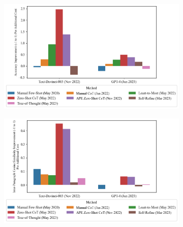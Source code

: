 \documentclass[11pt]{article}
\begin{document}
\begin{figure}
  \caption{Gains Per Cent v. Direct Prompting}
  \begin{subfigure}[h]{0.4925\textwidth}
      \centering
      \includegraphics[width=0.95\hsize]{../Output for Report/gsm8k_change_in_accuracy_quality_per_change_in_cost_sorted_by_technique_age.png} 
  \end{subfigure}
  \begin{subfigure}[h]{0.4925\textwidth}
      \centering
      \includegraphics[width=0.95\hsize]{../Output for Report/cw_change_in_accuracy_quality_per_change_in_cost_sorted_by_technique_age_transformed.png}
  \end{subfigure}
  \hfill
  \label{fig:gains_v_dp_cost}
\end{figure}
\end{document}
